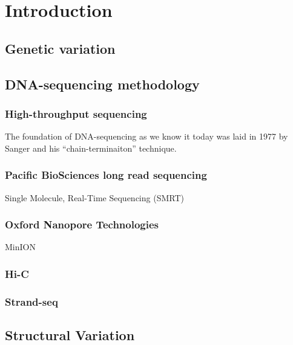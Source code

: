 \chapter{Introduction}

\section{Genetic variation}
\label{sec:variation}

\section{DNA-sequencing methodology}


\subsection{High-throughput sequencing}
\label{sec:hts}

The foundation of DNA-sequencing as we know it today was laid in 1977 by
Sanger and his ``chain-terminaiton'' technique.


\subsection{Pacific BioSciences\textsuperscript{\textregistered} long read sequencing}
\label{sec:pacbio}
Single Molecule, Real-Time Sequencing (SMRT\textsuperscript{\textregistered})

\subsection{Oxford Nanopore Technologies\textsuperscript{\textregistered}}
\label{sec:ont}
MinION\textregistered

\subsection{Hi-C}
\label{sec:hic}

\subsection{Strand-seq}
\label{sec:strandseq}

\section{Structural Variation}
\label{sec:sv}
